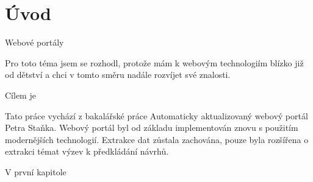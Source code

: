 \chapter{Úvod}
Webové portály \blindtext

Pro toto téma jsem se rozhodl, protože mám k webovým technologiím blízko již od dětství a chci v tomto směru nadále rozvíjet své znalosti.

Cílem je \blindtext

Tato práce vychází z bakalářské práce Automaticky aktualizovaný webový portál Petra Staňka. %
Webový portál byl od základu implementován znovu s použitím modernějších technologií. Extrakce dat zůstala zachována, pouze byla rozšířena o extrakci témat výzev k předkládání návrhů.

V první kapitole \blindtext